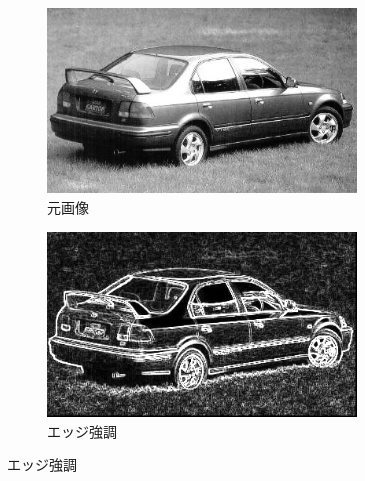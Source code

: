 \documentclass[a4paper,12pt]{jsarticle}
\begin{document}
\begin{figure}[!htbp]
\centering
\begin{subfigure}[b]{0.45\textwidth}
    \centering
    \includegraphics[width=0.9\textwidth]{./sampleimages/sample10.png}
    \caption{元画像}
\end{subfigure}
\hfill
\begin{subfigure}[b]{0.45\textwidth}
    \centering
    \includegraphics[width=0.9\textwidth]{./images/edge_enhanced_sample10_edge.png}
    \caption{エッジ強調}
\end{subfigure}


\end{figure}
\end{document}
